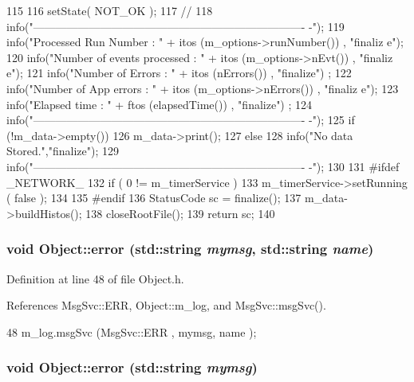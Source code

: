 \begin{DoxyCode}
115                                     {
116   setState( NOT_OK );
117   // 
118   info("-------------------------------------------------------------------------
      -");
119   info("Processed Run Number       : " + itos (m_options->runNumber()) , "finaliz
      e");
120   info("Number of events processed : " + itos (m_options->nEvt())      , "finaliz
      e");
121   info("Number of Errors           : " + itos (nErrors())           , "finalize")
      ;  
122   info("Number of App errors       : " + itos (m_options->nErrors())   , "finaliz
      e");
123   info("Elapsed time               : " + ftos (elapsedTime())       , "finalize")
      ;
124   info("-------------------------------------------------------------------------
      -");
125   if (!m_data->empty()) 
126     m_data->print();
127   else 
128     info("No data Stored.","finalize");
129   info("-------------------------------------------------------------------------
      -");
130 
131 #ifdef _NETWORK_
132   if ( 0 != m_timerService ){
133     m_timerService->setRunning ( false );
134   }
135 #endif
136   StatusCode sc = finalize();
137   m_data->buildHistos();  
138   closeRootFile();
139   return sc;
140 }
\end{DoxyCode}
\hypertarget{classObject_ad7f6c457733082efa2f9ff5f5c8e119a}{
\subsubsection[{error}]{\setlength{\rightskip}{0pt plus 5cm}void Object::error (std::string {\em mymsg}, \/  std::string {\em name})}}
\label{classObject_ad7f6c457733082efa2f9ff5f5c8e119a}


Definition at line 48 of file Object.h.

References MsgSvc::ERR, Object::m\_\-log, and MsgSvc::msgSvc().


\begin{DoxyCode}
48 { m_log.msgSvc (MsgSvc::ERR     , mymsg, name ); }
\end{DoxyCode}
\hypertarget{classObject_a204a95f57818c0f811933917a30eff45}{
\subsubsection[{error}]{\setlength{\rightskip}{0pt plus 5cm}void Object::error (std::string {\em mymsg})}}
\label{classObject_a204a95f57818c0f811933917a30eff45}


